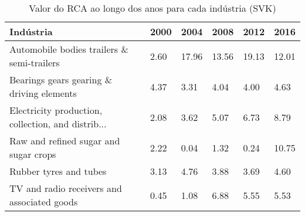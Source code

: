 \begin{table}
\centering
\caption{Valor do RCA ao longo dos anos para cada indústria (SVK)}
\begin{tabular}{p{6cm}p{1.5cm}p{1.5cm}p{1.5cm}p{1.5cm}p{1.5cm}}
\toprule
                                         Indústria & 2000 &  2004 &  2008 &  2012 &  2016 \\
\midrule
        Automobile bodies trailers \& semi-trailers & 2.60 & 17.96 & 13.56 & 19.13 & 12.01 \\
         Bearings gears gearing \& driving elements & 4.37 &  3.31 &  4.04 &  4.00 &  4.63 \\
Electricity production, collection, and distrib... & 2.08 &  3.62 &  5.07 &  6.73 &  8.79 \\
             Raw and refined sugar and sugar crops & 2.22 &  0.04 &  1.32 &  0.24 & 10.75 \\
                            Rubber tyres and tubes & 3.13 &  4.76 &  3.88 &  3.69 &  4.60 \\
       TV and radio receivers and associated goods & 0.45 &  1.08 &  6.88 &  5.55 &  5.53 \\
\bottomrule
\end{tabular}
\end{table}

